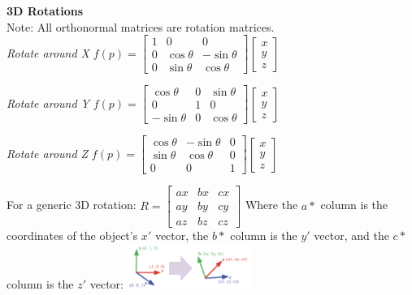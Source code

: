 \documentclass[letterpaper, 8pt]{extarticle}
\begin{document}
\begin{multicols*}{4}
    \textbf{3D Rotations} \\
    Note: All orthonormal matrices are rotation matrices. \\
    \textit{Rotate around X}
    \(
    f(p) = \begin{bmatrix}
        1 & 0           & 0            \\
        0 & \cos \theta & -\sin \theta \\
        0 & \sin \theta & \cos \theta
    \end{bmatrix}
    \begin{bmatrix}
        x \\ y \\ z
    \end{bmatrix}
    \)

    \textit{Rotate around Y}
    \(
    f(p) = \begin{bmatrix}
        \cos \theta  & 0 & \sin \theta \\
        0            & 1 & 0           \\
        -\sin \theta & 0 & \cos \theta
    \end{bmatrix}
    \begin{bmatrix}
        x \\ y \\ z
    \end{bmatrix}
    \)

    \textit{Rotate around Z}
    \(
    f(p) = \begin{bmatrix}
        \cos \theta & -\sin \theta & 0 \\
        \sin \theta & \cos \theta  & 0 \\
        0           & 0            & 1
    \end{bmatrix}
    \begin{bmatrix}
        x \\ y \\ z
    \end{bmatrix}
    \)

    For a generic 3D rotation:
    \(
    R =
    \begin{bmatrix}
        ax & bx & cx \\
        ay & by & cy \\
        az & bz & cz
    \end{bmatrix}
    \)
    Where the \(a*\) column is the coordinates of the object's \(x'\) vector,
    the \(b*\) column is the \(y'\) vector,
    and the \(c*\) column is the \(z'\) vector:
    \includegraphics[width=4cm]{3d-rotation.png}


\end{multicols*}
\end{document}

